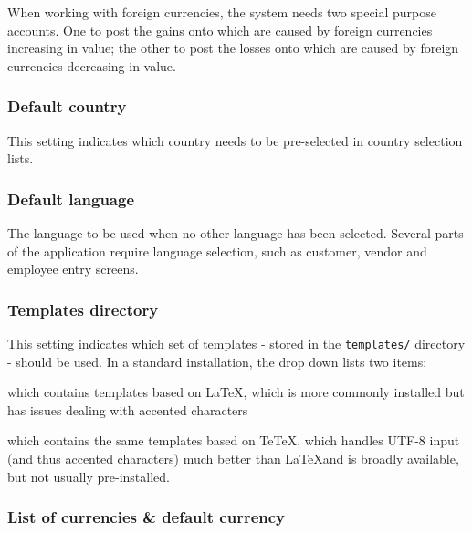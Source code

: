 When working with foreign currencies,
the system needs two special purpose accounts. One to post the gains onto which are
caused by foreign currencies increasing in value; the other to post the losses onto
which are caused by foreign currencies decreasing in value.


\subsubsection{Default country}
\label{subsubsec-company-config-defaults-country}

This setting indicates which country needs to be pre-selected
   in country selection lists.


\subsubsection{Default language}
\label{subsubsec-company-config-defaults-language}

The language to be used when no other language has been selected. Several parts of the
application require language selection, such as customer, vendor and employee entry screens.

\subsubsection{Templates directory}
\label{subsubsec-company-config-defaults-templates}

This setting indicates which set of templates - stored in the
   \texttt{templates/} directory - should be used. In a standard installation, the drop down
   lists two items:
\begin{description}[style=nextline]
   \item [demo] which contains templates based on \LaTeX, which is more commonly installed but has issues dealing with accented characters
   \item [xedemo] which contains the same templates based on TeTeX, which handles UTF-8 input (and thus accented characters) much better than \LaTeX and is broadly available, but not usually pre-installed.
   \end{description}


\subsubsection{List of currencies \& default currency}
\label{subsubsec-company-config-defaults-currencies}

